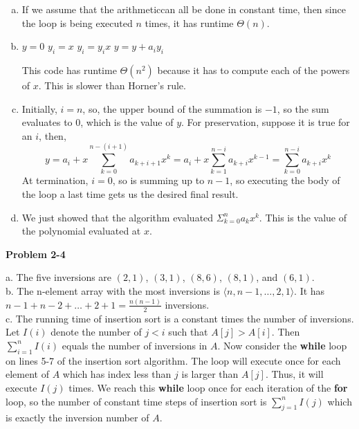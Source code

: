 \documentclass{article}
\begin{document}
\begin{enumerate}[a)]
\item

If we assume that the arithmeticcan all  be done in constant time, then since  the loop is being executed $n$ times, it has runtime $\Theta(n)$.

\item
\begin{algorithm}
\begin{algorithmic}[1]
\State $y=0$
\State $y_i = x$
\State $y_i = y_i  x$ 
\EndFor
\State $y = y+ a_i  y_i$
\EndFor
\end{algorithmic}
\end{algorithm}
This code has runtime $\Theta(n^2)$ because it has to compute each of the powers of $x$. This is slower than Horner's rule.

\item
Initially, $i=n$, so, the upper bound of the summation is $-1$, so the sum evaluates to $0$, which is the value of $y$. For preservation, suppose it is true for an $i$, then, 
\[
 y = a_{i} + x \sum_{k=0}^{n-(i+1)} a_{k+i+1} x^k = a_i + x\sum_{k=1}^{n-i} a_{k+i} x^{k-1} = \sum_{k=0}^{n-i} a_{k+i}x^k
 \]
  At termination, $i=0$, so is summing up to $n-1$, so executing the body of the loop a last time gets us  the desired final result.

\item
We just showed that the algorithm evaluated $\Sigma_{k=0}^n a_kx^k$. This is the value of the polynomial evaluated at $x$.

\end{enumerate}


\noindent\textbf{Problem 2-4}

a. The five inversions are $(2,1)$, $(3,1)$, $(8,6)$, $(8,1)$, and $(6,1)$. \\

b. The n-element array with the most inversions is $\langle n, n-1, \ldots, 2, 1 \rangle$.  It has $n-1 + n-2 + \ldots + 2 + 1 = \frac{n(n-1)}{2}$ inversions. \\

c. The running time of insertion sort is a constant times the number of inversions.  Let $I(i)$ denote the number of $j < i$ such that $A[j] > A[i]$.  Then $\sum_{i=1}^n I(i)$ equals the number of inversions in $A$.  Now consider the \textbf{while} loop on lines 5-7 of the insertion sort algorithm.  The loop will execute once for each element of $A$ which has index less than $j$ is larger than $A[j]$.  Thus, it will execute $I(j)$ times.  We reach this \textbf{while} loop once for each iteration of the \textbf{for} loop, so the number of constant time steps of insertion sort is $\sum_{j=1}^n I(j)$ which is exactly the inversion number of $A$.  \\
\end{document}
